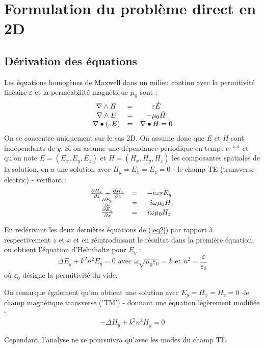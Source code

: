 \documentclass{article}
\begin{document}
\section{Formulation du problème direct en 2D}
\subsection{Dérivation des équations}
Les équations homogènes de Maxwell dans un milieu continu avec la permitivité linéaire $\varepsilon$ et la perméabilité magnétique $\mu_0$ sont :
\begin{equation}\label{MaxEq}
\begin{array}{c c c}
	\nabla\wedge H&=& \varepsilon\dot{E}\\
	\nabla\wedge E&=& -\mu_0\dot{H}\\
	\nabla\bullet(\varepsilon E)&=&\nabla\bullet H=0
\end{array}
\end{equation}
On se concentre uniquement sur le cas 2D. On assume donc que $E$ et $H$ sont indépendants de $y$. Si on assume une dépendance périodique en temps $e^{-i\omega t}$ et qu'on note $E=(E_x,E_y,E_z)$ et $H=(H_x,H_y,H_z)$ les composantes spatiales de la solution, on a une solution avec $H_y=E_x=E_z=0$ - le champ TE (transverse electric) - vérifiant :
\begin{equation} \label{eq2}
\begin{array}{c c c}
	\frac{\partial H_x}{\partial z} - \frac{\partial H_z}{\partial x}&=&-i\omega\varepsilon E_y\\
	\frac{\partial E_y}{\partial z}&=&-i\omega\mu_0H_x\\
	\frac{\partial E_y}{\partial x}&=&i\omega\mu_0  H_z
\end{array}
\end{equation}

En redérivant les deux dernières équations de (\ref{eq2}) par rapport à respectivement $z$ et $x$ et en réintroduisant le résultat dans la première équation, on obtient l'équation d'Helmholtz pour $E_y$ :
\[ \Delta E_y + k^2n^2E_y = 0 \text{ avec } \omega\sqrt{\mu_0\varepsilon_0}=k \text{ et } n^2=\frac{\varepsilon}{\varepsilon_0} \]
où $\varepsilon_0$ désigne la permitivité du vide.

On remarque également qu'on obtient une solution avec $E_y=H_x=H_z=0$ -le champ magnétique transverse ('TM') - donnant une équation légèrement modifiée :
	\[-\Delta H_y+k^2n^2H_y=0\]

Cependant, l'analyse ne se poursuivra qu'avec les modes du champ TE.
\end{document}
